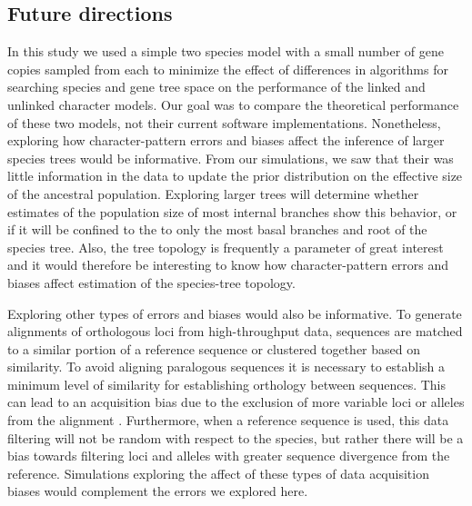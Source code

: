 

\subsection{Future directions}
In this study we used a simple two species model with a small number of gene
copies sampled from each to minimize the effect of differences in algorithms
for searching species and gene tree space on the performance of the linked and
unlinked character models.
Our goal was to compare the theoretical performance of these two models, not
their current software implementations.
Nonetheless, exploring how character-pattern errors and biases affect
the inference of larger species trees would be informative.
From our simulations, we saw that their was little information in the data to
update the prior distribution on the effective size of the ancestral population.
Exploring larger trees will determine whether estimates of the population size
of most internal branches show this behavior, or if it will be confined to the
to only the most basal branches and root of the species tree.
Also, the tree topology is frequently a parameter of great interest and
it would therefore be interesting to know how character-pattern errors and
biases affect estimation of the species-tree topology.

Exploring other types of errors and biases would also be informative.
To generate alignments of orthologous loci from high-throughput data, 
sequences are matched to a similar portion of a reference sequence or 
clustered together based on similarity. To avoid aligning paralogous sequences 
it is necessary to establish a minimum level of similarity for establishing 
orthology between sequences. This can lead to an acquisition bias due to the 
exclusion of more variable loci or alleles from the alignment \citep{huang2016unforeseen}.
Furthermore, when a reference 
sequence is used, this data filtering will not be random with respect to the
species, but rather there will be a bias towards filtering loci and alleles
with greater sequence divergence from the reference. 
Simulations exploring the affect of these types of data acquisition biases
would complement the errors we explored here.

